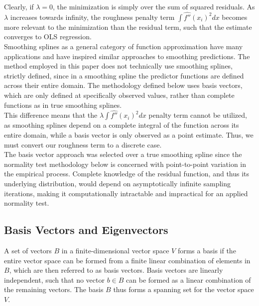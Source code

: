 \documentclass[12pt]{article}
\begin{document}
Clearly, if $\lambda=0$, the minimization is simply over the sum of squared residuals. As $\lambda$ increases towards infinity, the roughness penalty term $\int \hat{f''}(x_i)^2 dx$ becomes more relevant to the minimization than the residual term, such that the estimate converges to OLS regression.\\

Smoothing splines as a general category of function approximation have many applications and have inspired similar approaches to smoothing predictions. The method employed in this paper does not technically use smoothing splines, strictly defined, since in a smoothing spline the predictor functions are defined across their entire domain. The methodology defined below uses basis vectors, which are only defined at specifically observed values, rather than complete functions as in true smoothing splines.\\

This difference means that the $\lambda\int \hat{f''}(x_i)^2 dx$ penalty term cannot be utilized, as smoothing splines depend on a complete integral of the function across its entire domain, while a basis vector is only observed as a point estimate. Thus, we must convert our roughness term to a discrete case. \\

The basis vector approach was selected over a true smoothing spline since the normality test methodology below is concerned with point-to-point variation in the empirical process. Complete knowledge of the residual function, and thus its underlying distribution, would depend on asymptotically infinite sampling iterations, making it computationally intractable and impractical for an applied normality test.

\subsection{Basis Vectors and Eigenvectors}\label{subsec5}

A set of vectors $B$ in a finite-dimensional vector space $V$ forms a basis if the entire vector space can be formed from a finite linear combination of elements in $B$, which are then referred to as basis vectors. Basis vectors are linearly independent, such that no vector $b \in B$ can be formed as a linear combination of the remaining vectors. The basis $B$ thus forms a spanning set for the vector space $V$.\\
\end{document}

